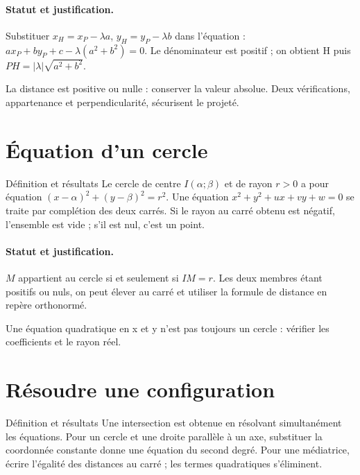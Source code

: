 \paragraph{Statut et justification.} Substituer $x_H=x_P-\lambda a$, $y_H=y_P-\lambda b$ dans l’équation : $ax_P+by_P+c-\lambda(a^2+b^2)=0$. Le dénominateur est positif ; on obtient H puis $PH=|\lambda|\sqrt{a^2+b^2}$.
\label{C07-EX2}

\begin{erreur}La distance est positive ou nulle : conserver la valeur absolue. Deux vérifications, appartenance et perpendicularité, sécurisent le projeté.\end{erreur}
\label{C07-AP2}
\section{Équation d’un cercle}\label{C07-U3}
\begin{repere}{Définition et résultats}
Le cercle de centre $I(\alpha;\beta)$ et de rayon $r>0$ a pour équation $(x-\alpha)^2+(y-\beta)^2=r^2$. Une équation $x^2+y^2+ux+vy+w=0$ se traite par complétion des deux carrés. Si le rayon au carré obtenu est négatif, l’ensemble est vide ; s’il est nul, c’est un point.
\end{repere}
\paragraph{Statut et justification.} $M$ appartient au cercle si et seulement si $IM=r$. Les deux membres étant positifs ou nuls, on peut élever au carré et utiliser la formule de distance en repère orthonormé.
\label{C07-EX3}
\begin{erreur}Une équation quadratique en x et y n’est pas toujours un cercle : vérifier les coefficients et le rayon réel.\end{erreur}
\label{C07-AP3}
\section{Résoudre une configuration}\label{C07-U4}
\begin{repere}{Définition et résultats}
Une intersection est obtenue en résolvant simultanément les équations. Pour un cercle et une droite parallèle à un axe, substituer la coordonnée constante donne une équation du second degré. Pour une médiatrice, écrire l’égalité des distances au carré ; les termes quadratiques s’éliminent.
\end{repere}
